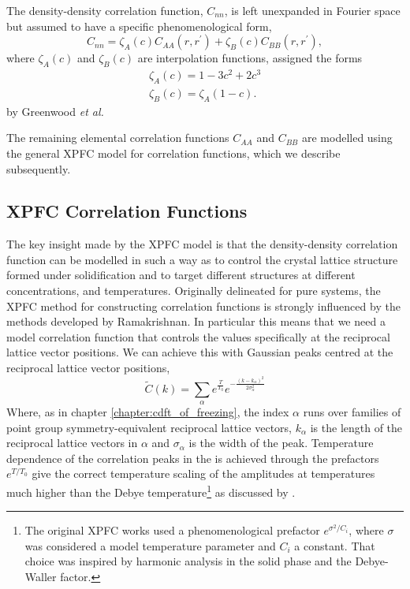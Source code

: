 \documentclass[showkeys, prb, reprint]{revtex4-1}
\newcommand{\f}{\frac}          %
\begin{document}
The density-density correlation function, $C_{nn}$, is left unexpanded in 
Fourier space but assumed to have a specific phenomenological form,
%
\begin{equation}
    \label{eq:xpfc_corr}
    C_{nn} = \zeta_A(c) C_{AA}(r, r^\prime) 
           + \zeta_B(c) C_{BB}(r, r^\prime),
\end{equation}
%
where $\zeta_A(c)$ and $\zeta_B(c)$ are interpolation functions, assigned the forms
%
\begin{gather}
    \zeta_A(c) = 1 - 3c^2 + 2c^3 \\
    \zeta_B(c) = \zeta_A(1 - c).
\end{gather}
%
by Greenwood \textit{et al.}

The remaining elemental correlation functions $C_{AA}$ and $C_{BB}$ are modelled
using the general XPFC model for correlation functions, which we describe
subsequently.

\subsection{XPFC Correlation Functions} %

The key insight made by the XPFC model is that the density-density
correlation function can be modelled in such a way as to control the crystal
lattice structure formed under solidification and to target different structures at
different concentrations, and temperatures. Originally delineated for pure
systems, the XPFC method for constructing correlation functions is strongly
influenced by the methods developed by Ramakrishnan. In particular this means
that we need a model correlation function that controls the values specifically
at the reciprocal lattice vector positions. We can achieve this with Gaussian
peaks centred at the reciprocal lattice vector positions,
%
\begin{equation}
    \tilde{C}(k) = \sum_{\alpha} e^{\f{T}{T_0}}
        e^{ - \f{(k - k_\alpha)^2}{2\sigma_\alpha^2}}
        \label{XPFC_C2}
\end{equation}
%
Where, as in chapter \ref{chapter:cdft_of_freezing}, the index $\alpha$ runs
over families of point group symmetry-equivalent reciprocal lattice vectors,
$k_\alpha$ is the length of the reciprocal lattice vectors in $\alpha$ and
$\sigma_\alpha$ is the width of the peak. Temperature dependence of the
correlation peaks in the is achieved through the prefactors $e^{T / T_0}$ give
the correct temperature scaling of the amplitudes at temperatures much higher
than the Debye temperature\footnote{The original XPFC works used a
phenomenological prefactor $e^{\sigma^2 / C_i}$, where $\sigma$ was considered
a model temperature parameter and $C_i$ a constant. That choice was inspired by
harmonic analysis in the solid phase and the Debye-Waller factor.} as discussed
by \cite{ALSTER17}.
\end{document}
